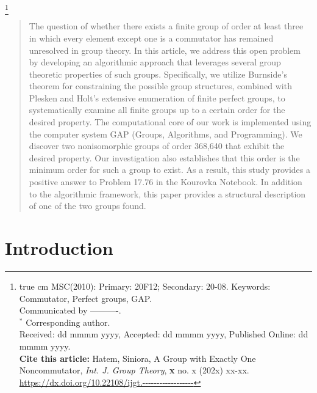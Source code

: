 \documentclass[11pt,twoside]{amsart}
\numberwithin{equation}{section}
\begin{document}
\thanks{{\scriptsize
{} true cm MSC(2010): Primary: 20F12; Secondary: 20-08.
\newline Keywords: Commutator, Perfect groups, GAP.\\
Communicated by ----------.\\
$^*$ Corresponding author.\\
Received: dd mmmm yyyy, Accepted: dd mmmm yyyy, Published Online: dd mmmm yyyy.\\
\textbf{Cite this article:} Hatem, Siniora, A Group with Exactly One Noncommutator, \emph{Int. J. Group Theory}, \textbf{x} no. x (202x) xx-xx.
{\url{https://dx.doi.org/10.22108/ijgt.------------------}}
}}
\maketitle
\begin{abstract} 
The question of whether there exists a finite group of order at least three in which every element except one is a commutator has remained unresolved in group theory. In this article, we address this open problem by developing an algorithmic approach that leverages several group theoretic properties of such groups. Specifically, we utilize Burnside’s theorem for constraining the possible group structures, combined with Plesken and Holt’s extensive enumeration of finite perfect groups, to systematically examine all finite groups up to a certain order for the desired property. The computational core of our work is implemented using the computer system GAP (Groups, Algorithms, and Programming). We discover two nonisomorphic groups of order 368,640 that exhibit the desired property. Our investigation also establishes that this order is the minimum order for such a group to exist. As a result, this study provides a positive answer to Problem 17.76 in the Kourovka Notebook. In addition to the algorithmic framework, this paper provides a structural description of one of the two groups found.
\end{abstract}

\bigskip
\bigskip


\section{\bf Introduction}
\end{document}
